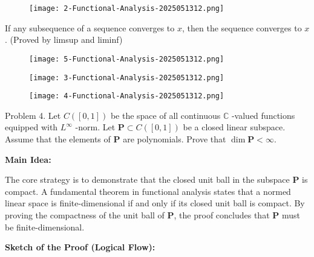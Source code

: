 \begin{exercise}
\begin{figure}[H]
\centering
\texttt{[image: 2-Functional-Analysis-2025051312.png]}
\label{}
\end{figure}
\end{exercise}
\begin{note}
If any subsequence of a sequence converges to $x$, then the sequence converges to $x$. (Proved by limsup and liminf)
\end{note}
\begin{figure}[H]
\centering
\texttt{[image: 5-Functional-Analysis-2025051312.png]}
\label{}
\end{figure}

\begin{figure}[H]
\centering
\texttt{[image: 3-Functional-Analysis-2025051312.png]}
\label{}
\end{figure}
\begin{figure}[H]
\centering
\texttt{[image: 4-Functional-Analysis-2025051312.png]}
\label{}
\end{figure}

\begin{exercise}
Problem 4. Let $C([0,1])$ be the space of all continuous $\mathbb{C}$ -valued functions equipped with $L^\infty$ -norm. Let $\mathbf{P} \subset C([0,1])$ be a closed linear subspace. Assume that the elements of $\mathbf{P}$ are polynomials. Prove that $\dim \mathbf{P} < \infty$.
\end{exercise}
\textbf{Main Idea:}

The core strategy is to demonstrate that the closed unit ball in the subspace $\mathbf{P}$ is compact. A fundamental theorem in functional analysis states that a normed linear space is finite-dimensional if and only if its closed unit ball is compact. By proving the compactness of the unit ball of $\mathbf{P}$, the proof concludes that $\mathbf{P}$ must be finite-dimensional.

\textbf{Sketch of the Proof (Logical Flow):}

